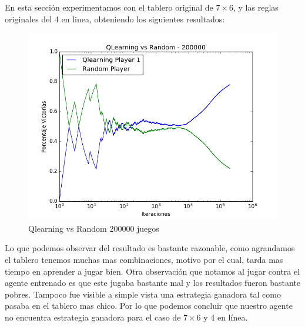 En esta sección experimentamos con el tablero original de $7\times6$, y las reglas originales del 4 en linea, obteniendo los siguientes resultados:\\







\begin{figure}[H]
 \centering
  \begin{minipage}[c]{1\textwidth}
	\centering
	\includegraphics[scale=0.5]{resultados/7x6/QlearningVsRandom_200000_7x6_parametros_informe.png}
        \caption{Qlearning vs Random 200000 juegos}
  \end{minipage}
\end{figure}

Lo que podemos observar del resultado es bastante razonable, como agrandamos el tablero tenemos muchas mas combinaciones, motivo por el cual, tarda mas tiempo en aprender a jugar bien.
Otra observación que notamos al jugar contra el agente entrenado es que este jugaba bastante mal y los resultados fueron bastante pobres. Tampoco fue visible a simple vista una estrategia ganadora tal como pasaba en el tablero mas chico.
Por lo que podemos concluir que nuestro agente no encuentra estrategia ganadora para el caso de $7\times6$ y 4 en línea.


